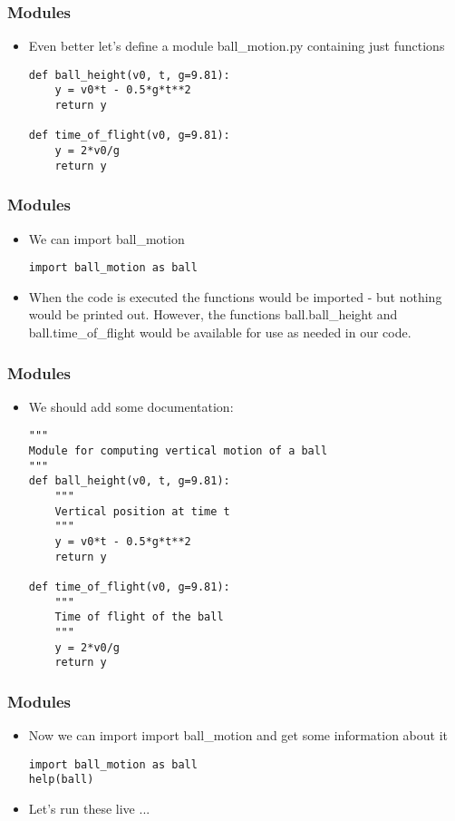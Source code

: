 \documentclass[english,14pt]{beamer}
\begin{document}
\begin{frame}[fragile]
\frametitle{Modules}
	\begin{itemize}
		\item Even better let's define a module ball\_motion.py containing just functions
		
\begin{lstlisting}[style=CStyle]
def ball_height(v0, t, g=9.81):          
    y = v0*t - 0.5*g*t**2
    return y                     

def time_of_flight(v0, g=9.81):           
    y = 2*v0/g                     
    return y                       
\end{lstlisting}
    \end{itemize}
\end{frame}


\begin{frame}[fragile]
\frametitle{Modules}
	\begin{itemize}
		\item We can import ball\_motion
\begin{lstlisting}[style=CStyle]
import ball_motion as ball
\end{lstlisting}
		\item When the code is executed the functions would be imported - but nothing would be printed out. However, the functions ball.ball\_height and ball.time\_of\_flight would be available for use as needed in our code.
    \end{itemize}
\end{frame}

\begin{frame}[fragile]
\frametitle{Modules}
	\begin{itemize}
		\item We should add some documentation:
\begin{lstlisting}[style=CStyle]
"""
Module for computing vertical motion of a ball
"""
def ball_height(v0, t, g=9.81):
    """
    Vertical position at time t
    """
    y = v0*t - 0.5*g*t**2
    return y                     

def time_of_flight(v0, g=9.81):           
    """
    Time of flight of the ball
    """
    y = 2*v0/g                     
    return y                      
\end{lstlisting}
	 \end{itemize}
\end{frame}

\begin{frame}[fragile]
\frametitle{Modules}
	\begin{itemize}
		\item Now we can import import ball\_motion and get some information about it

\begin{lstlisting}[style=CStyle]
import ball_motion as ball
help(ball)
\end{lstlisting}
       \item Let's run these live ...

    \end{itemize}
\end{frame}
\end{document}
